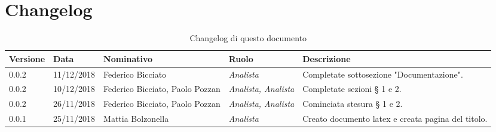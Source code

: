 \section*{Changelog}
\begin{table}[tbph]
        \centering
        \begin{tabularx}{\textwidth}{|l|l|l|l|X|}
                \hline
                \textbf{Versione} & \textbf{Data} & \textbf{Nominativo}  & \textbf{Ruolo} & 
                \textbf{Descrizione}\\
                
                \hline
                0.0.2 & 11/12/2018 & Federico Bicciato & \textit{Analista}
                & Completate sottosezione "Documentazione".\\
                
                \hline 				
                0.0.2 & 10/12/2018 & Federico Bicciato, Paolo Pozzan & \textit{Analista, Analista}
                & Completate sezioni § 1 e 2.\\                
                
                \hline
                0.0.2 & 26/11/2018 & Federico Bicciato, Paolo Pozzan & \textit{Analista, Analista}
                & Cominciata stesura § 1 e 2.\\

                \hline
                0.0.1 & 25/11/2018 & Mattia Bolzonella & \textit{Analista}
                & Creato documento latex e creata pagina del titolo.\\
                
                \hline
                
        \end{tabularx}
        \caption{Changelog di questo documento}
\end{table}